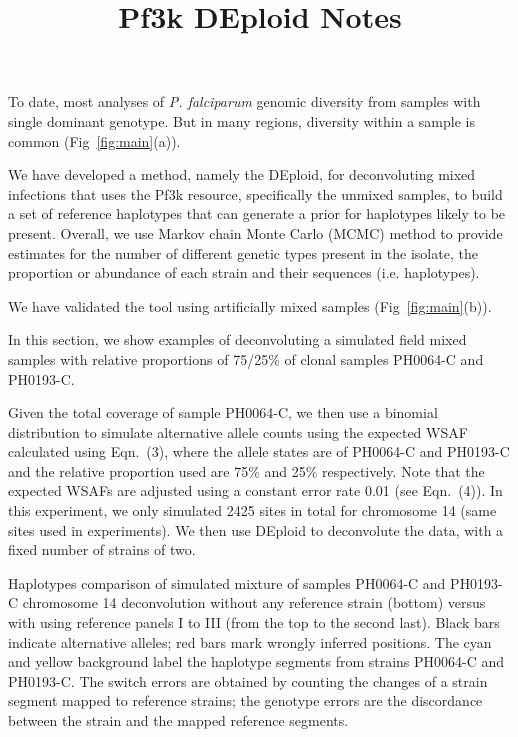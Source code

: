 \documentclass{article}
\title{Pf3k DEploid Notes}
\author{ }
\date{}
\begin{document}
\maketitle

To date, most analyses of {\it P. falciparum} genomic diversity from samples with single dominant genotype.  But in many regions, diversity within a sample is common (Fig~\ref{fig:main}(a)).


We have developed a method, namely the DEploid, for deconvoluting mixed infections that uses the Pf3k resource, specifically the unmixed samples, to build a set of reference haplotypes that can generate a prior for haplotypes likely to be present. Overall, we use Markov chain Monte Carlo (MCMC) method to provide estimates for the number of different genetic types present in the isolate, the proportion or abundance of each strain and their sequences (i.e. haplotypes).

We have validated the tool using artificially mixed samples (Fig~\ref{fig:main}(b)).

In this section, we show examples of deconvoluting a simulated field mixed samples with relative proportions of 75/25\% of clonal samples {\textmd PH0064-C} and {\textmd PH0193-C}.

Given the total coverage of sample {\textmd PH0064-C}, we then use a binomial distribution to simulate alternative allele counts using the expected WSAF calculated using \citet{Zhu2017} Eqn.~(3), where the allele states are of {\textmd PH0064-C} and {\textmd PH0193-C} and the relative proportion used are 75\% and 25\% respectively. Note that the expected WSAFs are adjusted using a constant error rate 0.01 (see Eqn.~(4)). In this experiment, we only simulated 2425 sites in total for chromosome 14 (same sites used in \citet{Zhu2017} experiments). We then use DEploid to deconvolute the data, with a fixed number of strains of two.

Haplotypes comparison of simulated mixture of samples {\textmd PH0064-C} and {\textmd PH0193-C} chromosome 14 deconvolution without any reference strain (bottom) versus with using reference panels I to III (from the top to the second last). Black bars indicate alternative alleles; red bars mark wrongly inferred positions. The cyan and yellow background label the haplotype segments from strains {\textmd PH0064-C} and {\textmd PH0193-C}. The switch errors are obtained by counting the changes of a strain segment mapped to reference strains; the genotype errors are the discordance between the strain and the mapped reference segments.
\end{document}
